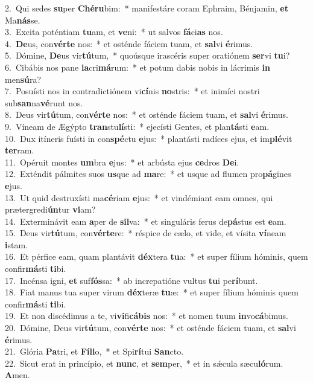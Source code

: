 {2.~}Qui sedes \textbf{su}per \textbf{Ché}\textbf{ru}bim:~* manifestáre coram Ephraim, Bénjamin, \textbf{et} Ma\textbf{nás}se.\\
{3.~}Excita poténtiam \textbf{tu}am, et \textbf{ve}ni:~* ut salvos \textbf{fá}ci\textbf{as} nos.\\
{4.~}\textbf{De}us, con\textbf{vér}\textbf{te} nos:~* et osténde fáciem tuam, et \textbf{sal}vi \textbf{é}rimus.\\
{5.~}Dómine, \textbf{De}us vir\textbf{tú}tum,~* quoúsque irascéris super oratiónem \textbf{ser}vi \textbf{tu}i?\\
{6.~}Cibábis nos pane \textbf{la}cri\textbf{má}rum:~* et potum dabis nobis in lácrimis \textbf{in} men\textbf{sú}ra?\\
{7.~}Posuísti nos in contradictiónem vi\textbf{cí}nis \textbf{no}stris:~* et inimíci nostri sub\textbf{san}na\textbf{vé}runt nos.\\
{8.~}Deus vir\textbf{tú}tum, con\textbf{vér}\textbf{te} nos:~* et osténde fáciem tuam, et \textbf{sal}vi \textbf{é}rimus.\\
{9.~}Víneam de Ægýpto \textbf{tran}stu\textbf{lí}sti:~* ejecísti Gentes, et plan\textbf{tá}sti \textbf{e}am.\\
{10.~}Dux itíneris fuísti in con\textbf{spé}ctu \textbf{e}jus:~* plantásti radíces ejus, et im\textbf{plé}vit \textbf{ter}ram.\\
{11.~}Opéruit montes \textbf{um}bra \textbf{e}jus:~* et arbústa ejus \textbf{ce}dros \textbf{De}i.\\
{12.~}Exténdit pálmites suos \textbf{us}que ad \textbf{ma}re:~* et usque ad flumen pro\textbf{pá}gines \textbf{e}jus.\\
{13.~}Ut quid destruxísti ma\textbf{cé}riam \textbf{e}jus:~* et vindémiant eam omnes, qui prætergredi\textbf{ún}tur \textbf{vi}am?\\
{14.~}Exterminávit eam \textbf{a}per de \textbf{sil}va:~* et singuláris ferus de\textbf{pá}stus est \textbf{e}am.\\
{15.~}Deus vir\textbf{tú}tum, con\textbf{vér}\textbf{te}re:~* réspice de cælo, et vide, et vísita \textbf{ví}neam \textbf{i}stam.\\
{16.~}Et pérfice eam, quam plantávit \textbf{déx}tera \textbf{tu}a:~* et super fílium hóminis, quem confir\textbf{má}sti \textbf{ti}bi.\\
{17.~}Incénsa igni, \textbf{et} suf\textbf{fós}sa:~* ab increpatióne vultus \textbf{tu}i pe\textbf{rí}bunt.\\
{18.~}Fiat manus tua super virum \textbf{déx}teræ \textbf{tu}æ:~* et super fílium hóminis quem confir\textbf{má}sti \textbf{ti}bi.\\
{19.~}Et non discédimus a te, vi\textbf{vi}fi\textbf{cá}\textbf{bis} nos:~* et nomen tuum \textbf{in}vo\textbf{cá}bimus.\\
{20.~}Dómine, Deus vir\textbf{tú}tum, con\textbf{vér}\textbf{te} nos:~* et osténde fáciem tuam, et \textbf{sal}vi \textbf{é}rimus.\\
{21.~}Glória \textbf{Pa}tri, et \textbf{Fí}\textbf{li}o,~* et Spi\textbf{rí}tui \textbf{San}cto.\\
{22.~}Sicut erat in princípio, et \textbf{nunc}, et \textbf{sem}per,~* et in sǽcula sæcu\textbf{ló}rum. \textbf{A}men.\\
